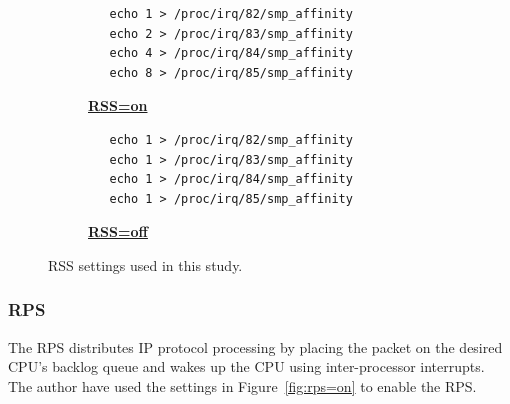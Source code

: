 \begin{figure}[h]

  \begin{subfigure}[t]{\columnwidth}
    \centering
    \begin{minipage}{0.6\columnwidth}
\begin{verbatim}
   echo 1 > /proc/irq/82/smp_affinity
   echo 2 > /proc/irq/83/smp_affinity
   echo 4 > /proc/irq/84/smp_affinity
   echo 8 > /proc/irq/85/smp_affinity
\end{verbatim}
    \end{minipage}
    \caption{\underline{\textbf{RSS=on}}}
    \label{fig:rss=on}
  \end{subfigure}

  \par\bigskip

  \begin{subfigure}[t]{\columnwidth}
    \centering
    \begin{minipage}{0.6\columnwidth}
\begin{verbatim}
   echo 1 > /proc/irq/82/smp_affinity
   echo 1 > /proc/irq/83/smp_affinity
   echo 1 > /proc/irq/84/smp_affinity
   echo 1 > /proc/irq/85/smp_affinity
\end{verbatim}
    \end{minipage}
    \caption{\underline{\textbf{RSS=off}}}
    \label{fig:rss=off}
  \end{subfigure}

  \par\bigskip
  \centering
  \begin{minipage}{0.9\columnwidth}
    \caption[RSS settings]{
      RSS settings used in this study.
    }
    \label{fig:rss_settings}
  \end{minipage}

  \par\bigskip
\end{figure}

\subsubsection{RPS}

The RPS distributes IP protocol processing by placing the packet
on the desired CPU's backlog queue and wakes up the CPU using inter-processor interrupts.
The author have used the settings in Figure~\ref{fig:rps=on} to enable the RPS.

